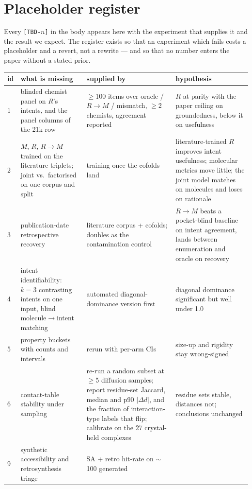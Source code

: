 \section{Placeholder register}

Every \texttt{[TBD-$n$]} in the body appears here with the experiment that supplies it and the
result we expect. The register exists so that an experiment which fails costs a placeholder and a
revert, not a rewrite --- and so that no number enters the paper without a stated prior.

\begin{table}[H]\centering\small
\begin{tabular}{p{0.5cm}p{4.6cm}p{4.2cm}p{5.2cm}}
\toprule
id & what is missing & supplied by & hypothesis \\
\midrule
1 & blinded chemist panel on $R$'s intents, and the panel columns of the 21k row &
$\geq$100 items over oracle / $R\!\rightarrow\!M$ / mismatch, $\geq$2 chemists, agreement reported &
$R$ at parity with the paper ceiling on groundedness, below it on usefulness \\
2 & $M$, $R$, $R\!\rightarrow\!M$ trained on the literature triplets; joint vs.\ factorised on one
corpus and split & training once the cofolds land &
literature-trained $R$ improves intent usefulness; molecular metrics move little; the joint model
matches on molecules and loses on rationale \\
3 & publication-date retrospective recovery & literature corpus + cofolds; doubles as the
contamination control & $R\!\rightarrow\!M$ beats a pocket-blind baseline on intent agreement, lands
between enumeration and oracle on recovery \\
4 & intent identifiability: $k=3$ contrasting intents on one input, blind molecule$\rightarrow$intent
matching & automated diagonal-dominance version first & diagonal dominance significant but well
under 1.0 \\
5 & property buckets with counts and intervals & rerun with per-arm CIs & size-up and rigidity stay
wrong-signed \\
6 & contact-table stability under sampling & re-run a random subset at $\geq$5 diffusion samples;
report residue-set Jaccard, median and p90 $|\Delta d|$, and the fraction of interaction-type labels
that flip; calibrate on the 27 crystal-held complexes & residue sets stable, distances not;
conclusions unchanged \\
9 & synthetic accessibility and retrosynthesis triage & SA + retro hit-rate on $\sim$100 generated

\end{tabular}
\end{table}
